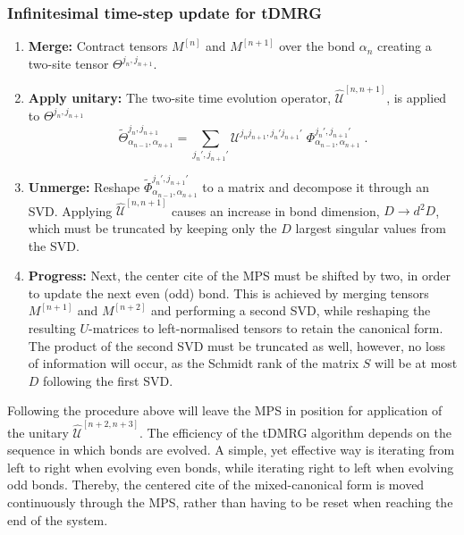 \subsubsection{Infinitesimal time-step update for tDMRG}
\begin{enumerate}
\item
\textbf{Merge:} Contract tensors $M^{[n]}$ and $M^{[n+1]}$ over the bond $\alpha_{n}$ creating a two-site tensor $\Theta^{j_n , j_{n+1}}$.

\item
\textbf{Apply unitary:} The two-site time evolution operator, $\hat{\mathcal{U}}^{[n, n+1]}$, is applied to $\Theta^{j_n , j_{n+1}}$
\begin{equation}
	\tilde{\Theta}_{\alpha_{n-1} , \alpha_{n+1}}^{j_n , j_{n+1} } = \sum_{j_n ', j_{n+1}'} \mathcal{U}^{j_n  j_{n+1} , j_n '  j_{n+1}'} \; \Phi_{\alpha_{n-1} , \alpha_{n+1}}^{j_n ', j_{n+1} ' } \; .
\end{equation}

\item
\textbf{Unmerge:} Reshape $\tilde{\Phi}_{\alpha_{n-1} , \alpha_{n+1}}^{j_n ', j_{n+1} '}$ to a matrix and decompose it through an SVD. Applying $\hat{\mathcal{U}}^{[n, n+1]}$ causes an increase in bond dimension, $D \rightarrow d^2 D$, which must be truncated by keeping only the $D$ largest singular values from the SVD. 

\item
\textbf{Progress:}  Next, the center cite of the MPS must be shifted by two, in order to update the next even (odd) bond. This is achieved by merging tensors $M^{[n+1]}$ and $M^{[n+2]}$ and performing a second SVD, while reshaping the resulting $U$-matrices to left-normalised tensors to retain the canonical form. The product of the second SVD must be truncated as well, however, no loss of information will occur, as the Schmidt rank of the matrix $S$ will be at most $D$ following the first SVD. 
\end{enumerate}
Following the procedure above will leave the MPS in position for application of the unitary $\hat{\mathcal{U}}^{[n+2 , n+3]}$. The efficiency of the tDMRG algorithm depends on the sequence in which bonds are evolved. A simple, yet effective way is iterating from left to right when evolving even bonds, while iterating right to left when evolving odd bonds. Thereby, the centered cite of the mixed-canonical form is moved continuously through the MPS, rather than having to be reset when reaching the end of the system.

